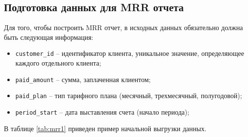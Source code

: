 \subsection{Подготовка данных для MRR отчета}

Для того, чтобы построить MRR отчет, в исходных данных обязательно должна быть следующая информация:

\begin{itemize}
	\item \texttt{customer\_id} -- идентификатор клиента, уникальное значение, определяющее каждого отдельного клиента;
	\item \texttt{paid\_amount} -- сумма, заплаченная клиентом;
	\item \texttt{paid\_plan} -- тип тарифного плана (месячный, трехмесячный, полугодовой);
	\item \texttt{period\_start} -- дата выставления счета (начало периода);
\end{itemize}

В таблице \ref{tab:mrr1} приведен пример начальной выгрузки данных.

